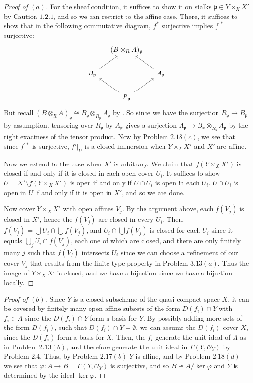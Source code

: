 \documentclass[12pt,letterpaper]{article}
\theoremstyle{definition}
\theoremstyle{remark}
\numberwithin{equation}{section}
\numberwithin{figure}{problem}
\newcommand{\OO}{\mathcal{O}}
\begin{document}
\begin{proof}[Proof of $(a)$]
  For the sheaf condition, it suffices to show it on stalks $\mathfrak{p} \in Y \times_X X'$ by Caution $1.2.1$, and so we can restrict to the affine case. There, it suffices to show that in the following commutative diagram, $f^*$ surjective implies $f^{\prime*}$ surjective:
  \begin{equation*}
    \begin{tikzcd}[column sep=small]
      \ & (B \otimes_R A)_{\mathfrak{p}}\\
      B_{\mathfrak{p}}\arrow{ur} & & A_{\mathfrak{p}}\arrow{ul}\\
      & R_{\mathfrak{p}}\arrow{ul}\arrow{ur}
    \end{tikzcd}
  \end{equation*}
  But recall $(B \otimes_R A)_{\mathfrak{p}} \cong B_\mathfrak{p} \otimes_{R_\mathfrak{p}} A_\mathfrak{p}$ by \cite[Prop.~3.7]{AM69}. So since we have the surjection $R_\mathfrak{p} \to B_\mathfrak{p}$ by assumption, tensoring over $R_\mathfrak{p}$ by $A_\mathfrak{p}$ gives a surjection $A_\mathfrak{p} \to B_\mathfrak{p} \otimes_{R_\mathfrak{p}} A_\mathfrak{p}$ by the right exactness of the tensor product. Now by Problem $2.18(c)$, we see that since $f^{\prime*}$ is surjective, $f'\vert_{U}$ is a closed immersion when $Y \times_X X'$ and $X'$ are affine.
  \par Now we extend to the case when $X'$ is arbitrary. We claim that $f(Y \times_X X')$ is closed if and only if it is closed in each open cover $U_i$. It suffices to show $U = X' \setminus f(Y \times_X X')$ is open if and only if $U \cap U_i$ is open in each $U_i$. $U \cap U_i$ is open in $U$ if and only if it is open in $X'$, and so we are done.
  \par Now cover $Y \times_X X'$ with open affines $V_j$. By the argument above, each $f(V_j)$ is closed in $X'$, hence the $f(V_j)$ are closed in every $U_i$. Then, $f(V_j) = \bigcup U_i \cap \bigcup f(V_j)$, and $U_i \cap \bigcup f(V_j)$ is closed for each $U_i$ since it equals $\bigcup_j U_i \cap f(V_j)$, each one of which are closed, and there are only finitely many $j$ such that $f(V_j)$ intersects $U_i$ since we can choose a refinement of our cover $V_j$ that results from the finite type property in Problem $3.13(a)$. Thus the image of $Y \times_X X'$ is closed, and we have a bijection since we have a bijection locally.
\end{proof}
\begin{proof}[Proof of $(b)$]
  Since $Y$ is a closed subscheme of the quasi-compact space $X$, it can be covered by finitely many open affine subsets of the form $D(f_i) \cap Y$ with $f_i \in A$ since the $D(f_i) \cap Y$ form a basis for $Y$. By possibly adding more sets of the form $D(f_i)$, such that $D(f_i) \cap Y = \emptyset$, we can assume the $D(f_i)$ cover $X$, since the $D(f_i)$ form a basis for $X$. Then, the $f_i$ generate the unit ideal of $A$ as in Problem $2.13(b)$, and therefore generate the unit ideal in $\Gamma(Y,\OO_Y)$ by Problem $2.4$. Thus, by Problem $2.17(b)$ $Y$ is affine, and by Problem $2.18(d)$ we see that $\varphi\colon A \to B = \Gamma(Y,\OO_Y)$ is surjective, and so $B \cong A/\ker\varphi$ and $Y$ is determined by the ideal $\ker\varphi$.
\end{proof}
\end{document}
